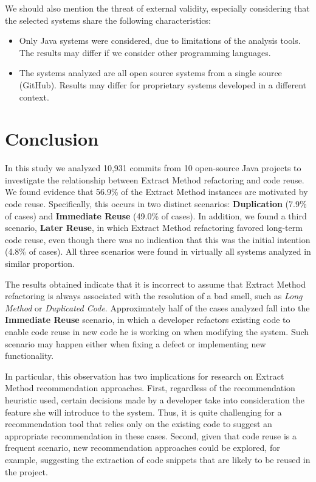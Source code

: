 We should also mention the threat of external validity, especially considering that the selected systems share the following characteristics:
\begin {itemize}
\item Only Java systems were considered, due to limitations of the analysis tools. The results may differ if we consider other programming languages.

\item The systems analyzed are all open source systems from a single source (GitHub). Results may differ for proprietary systems developed in a different context.
\end{itemize}


\section{Conclusion}
\label{sconclusao}

In this study we analyzed 10,931 commits from 10 open-source Java projects to investigate the relationship between Extract Method refactoring and code reuse. We found evidence that 56.9\% of the Extract Method instances are motivated by code reuse. Specifically, this occurs in two distinct scenarios: \textbf{Duplication} (7.9\% of cases) and \textbf{Immediate Reuse} (49.0\% of cases).
In addition, we found a third scenario, \textbf{Later Reuse}, in which Extract Method refactoring favored long-term code reuse, even though there was no indication that this was the initial intention (4.8\% of cases).
All three scenarios were found in virtually all systems analyzed in similar proportion.

The results obtained indicate that it is incorrect to assume that Extract Method refactoring is always associated with the resolution of a bad smell, such as \emph{Long Method} or \emph{Duplicated Code}. Approximately half of the cases analyzed fall into the \textbf{Immediate Reuse} scenario, in which a developer refactors existing code to enable code reuse in new code he is working on when modifying the system. Such scenario may happen either when fixing a defect or implementing new functionality.

In particular, this observation has two implications for research on Extract Method recommendation approaches. First, regardless of the recommendation heuristic used, certain decisions made by a developer take into consideration the feature she will introduce to the system. Thus, it is quite challenging for a recommendation tool that relies only on the existing code to suggest an appropriate recommendation in these cases.
Second, given that code reuse is a frequent scenario, new recommendation approaches could be explored, for example, suggesting the extraction of code snippets that are likely to be reused in the project.
